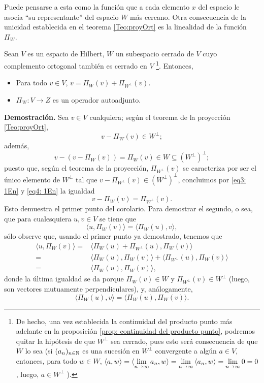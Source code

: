 Puede pensarse a esta como la función que a cada elemento
$x$ del espacio le asocia ``su representante'' del espacio $W$
más cercano. Otra consecuencia de la unicidad establecida en el teorema
\ref{Teo:proyOrt} es la linealidad de la función
$\Pi_{W}$. 

\begin{cor}
\label{cor: x como suma de proyecciones}
Sean $V$ es un espacio de Hilbert, $W$ un subespacio cerrado de 
$V$ cuyo complemento ortogonal también es cerrado en $V$ 
\footnote{De hecho, una vez establecida la continuidad
del producto punto más adelante en la
proposición \ref{prop: continuidad del producto punto}, podremos
quitar la hipótesis de que $W^{\perp}$ sea cerrado, pues esto
será consecuencia de que $W$ lo sea (si $(a_{n})_{n \in \mathbb{N}}$
es una sucesión en $W^{\perp}$ convergente a algún $a \in V$,
entonces, para todo $w \in W$,
$\langle a, w \rangle = 
\langle \lim\limits_{n \rightarrow \infty}{a_{n}}, w \rangle
= \lim\limits_{n \rightarrow \infty}{\langle a_{n},w \rangle}=
\lim\limits_{n \rightarrow \infty}{0}=0$,
luego, $a \in W^{\perp}$ ).}. Entonces,
\begin{itemize}
\item Para todo $v \in V$, $v= \Pi_{W}(v)+ \Pi_{W^{\perp}}(v)$.
\item $\Pi_{W}: V \longrightarrow Z$ es un operador autoadjunto.
\end{itemize}
\end{cor}
\noindent
\textbf{Demostración.}
Sea $v \in V$ cualquiera; según el teorema
de la proyección
\ref{Teo:proyOrt}, 
\begin{equation}
\label{eq3: 1En}
v - \Pi_{W}(v) \in W^{\perp};
\end{equation}
además,
\begin{equation}
\label{eq4: 1En}
v-(v-\Pi_{W}(v))= \Pi_{W}(v) \in W \subseteq (W^{\perp})^{\perp};
\end{equation}
puesto que, según el teorema de la proyección, 
$\Pi_{W^{\perp}}(v)$ se caracteriza por ser el 
único elemento de $W^{\perp}$ tal que 
$v-\Pi_{W^{\perp}}(v) \in (W^{\perp})^{\perp}$,
concluimos por \eqref{eq3: 1En} y \eqref{eq4: 1En}
la igualdad
\[
v-\Pi_{W}(v)= \Pi_{W^{\perp}}(v).
\]
Esto demuestra el primer punto del corolario. Para demostrar
el segundo, o sea, que para cualesquiera
$u, v \in V$ se tiene que
\[
\langle u, \Pi_{W}(v) \rangle = 
\langle \Pi_{W}(u), v \rangle,
\]
sólo observe que,
usando el primer punto ya demostrado, tenemos que
\begin{align*}
\langle u, \Pi_{W}(v) \rangle = & 
\langle \Pi_{W}(u) + \Pi_{W^{\perp}}(u), \Pi_{W}(v) \rangle  \\
= & \langle \Pi_{W}(u), \Pi_{W}(v) \rangle  + 
\langle \Pi_{W^{\perp}}(u), \Pi_{W}(v) \rangle  \\
= & \langle \Pi_{W}(u), \Pi_{W}(v) \rangle  ,
\end{align*}
donde la última igualdad se da porque $\Pi_{W}(v) \in W$ y 
$\Pi_{W^{\perp}}(v) \in W^{\perp}$ (luego,
son vectores mutuamente perpendiculares), y, análogamente,
\[
\langle \Pi_{W}(u), v \rangle  =  
\langle \Pi_{W}(u), \Pi_{W}(v)\rangle .
\]
\QEDB
\vspace{0.2cm}


